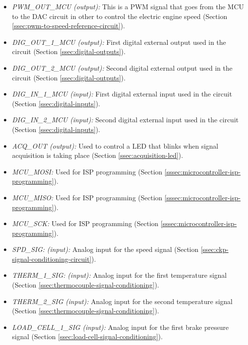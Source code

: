 \begin{itemize}
					\item \textit{PWM_OUT_MCU (output):} This is a PWM signal that goes from the MCU to the DAC circuit in other to control the electric engine speed (Section \ref{ssec:pwm-to-speed-reference-circuit}).\label{itm:mcu-port-pwm-out-mcu}
					\item \textit{DIG_OUT_1_MCU (output):} First digital external output used in the circuit (Section \ref{ssec:digital-outputs}).\label{itm:mcu-port-dig-out-1-mcu}
					\item \textit{DIG_OUT_2_MCU (output):} Second digital external output used in the circuit (Section \ref{ssec:digital-outputs}).\label{itm:mcu-port-dig-out-2-mcu}
					\item \textit{DIG_IN_1_MCU (input):} First digital external input used in the circuit (Section \ref{ssec:digital-inputs}).\label{itm:mcu-port-dig-in-1-mcu}
					\item \textit{DIG_IN_2_MCU (input):} Second digital external input used in the circuit (Section \ref{ssec:digital-inputs}).\label{itm:mcu-port-dig-in-2-mcu} 
					\item \textit{ACQ_OUT (output):} Used to control a LED that blinks when signal acquisition is taking place (Section \ref{ssec:acquisition-led}).\label{itm:mcu-port-acq-out}   
					\item \textit{MCU_MOSI:} Used for ISP programming (Section \ref{sssec:microcontroller-isp-programming}).\label{itm:mcu-port-mcu-mosi}
					\item \textit{MCU_MISO:} Used for ISP programming (Section \ref{sssec:microcontroller-isp-programming}).\label{itm:mcu-port-mcu-miso}
					\item \textit{MCU_SCK:} Used for ISP programming (Section \ref{sssec:microcontroller-isp-programming}).\label{itm:mcu-port-mcu-sck}
					\item \textit{SPD_SIG: (input):} Analog input for the speed signal (Section \ref{ssec:ckp-signal-conditioning-circuit}).\label{itm:mcu-port-spd-sig}
					\item \textit{THERM_1_SIG: (input):} Analog input for the first temperature signal (Section \ref{ssec:thermocouple-signal-conditioning}).\label{itm:mcu-port-therm-1-sig}
					\item \textit{THERM_2_SIG (input):} Analog input for the second temperature signal (Section \ref{ssec:thermocouple-signal-conditioning}).\label{itm:mcu-port-therm-2-sig}
					\item \textit{LOAD_CELL_1_SIG (input):} Analog input for the first brake pressure signal (Section \ref{ssec:load-cell-signal-conditioning}).\label{itm:mcu-port-load-cell-1-sig}  

\end{itemize}
